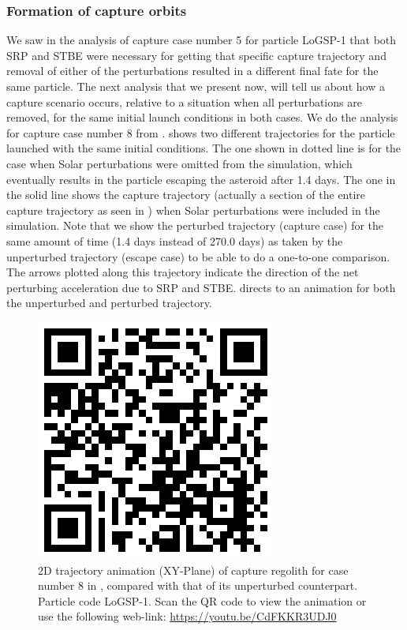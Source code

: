\subsubsection{Formation of capture orbits}
We saw in the analysis of capture case number 5 for particle LoGSP-1 that both \gls{SRP} and \gls{STBE} were necessary for getting that specific capture trajectory and removal of either of the perturbations resulted in a different final fate for the same particle. The next analysis that we present now, will tell us about how a capture scenario occurs, relative to a situation when all perturbations are removed, for the same initial launch conditions in both cases. We do the analysis for capture case number 8 from .  shows two different trajectories for the particle launched with the same initial conditions. The one shown in dotted line is for the case when Solar perturbations were omitted from the simulation, which eventually results in the particle escaping the asteroid after 1.4 days. The one in the solid line shows the capture trajectory (actually a section of the entire capture trajectory as seen in ) when Solar perturbations were included in the simulation. Note that we show the perturbed trajectory (capture case) for the same amount of time (1.4 days instead of 270.0 days) as taken by the unperturbed trajectory (escape case) to be able to do a one-to-one comparison. The arrows plotted along this trajectory indicate the direction of the net perturbing acceleration due to \gls{SRP} and \gls{STBE}.  directs to an animation for both the unperturbed and perturbed trajectory.
\begin{figure}[htb]
\centering
\captionsetup{justification=centering}
\includegraphics[scale=0.25]{longest_edge_perturbations/3.2Density_1cmSize/qrcode_comparative_8ms_165Azimuth_45SolarPhase.png}
\caption{2D trajectory animation (XY-Plane) of capture regolith for case number 8 in , compared with that of its unperturbed counterpart. Particle code LoGSP-1. Scan the QR code to view the animation or use the following web-link: \url{https://youtu.be/CdFKKR3UDJ0}}
\label{fig:LoGSP_1_capture_case_8_2d_trajectory_comparative_animation}
\end{figure}
